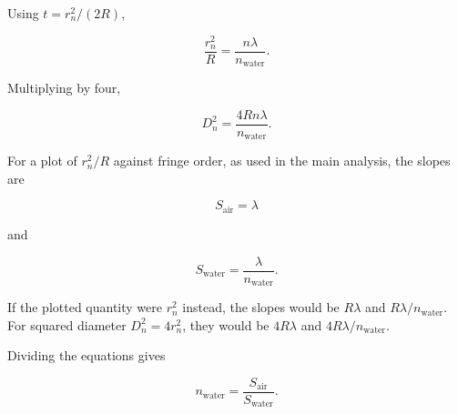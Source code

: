 \documentclass[12pt,a4paper]{article}
\begin{document}
Using $t=r_n^2/(2R)$,

\[
\frac{r_n^2}{R}
=\frac{n\lambda}{n_{\mathrm{water}}}.
\]

Multiplying by four,

\[
D_n^2
=\frac{4Rn\lambda}{n_{\mathrm{water}}}.
\]

For a plot of $r_n^2/R$ against
fringe order, as used in the main
analysis, the slopes are

\[
S_{\mathrm{air}}=\lambda
\]

and

\[
S_{\mathrm{water}}
 =\frac{\lambda}{n_{\mathrm{water}}}.
\]

If the plotted quantity were $r_n^2$
instead, the slopes would be
$R\lambda$ and $R\lambda/n_{\mathrm{water}}$.
For squared diameter $D_n^2=4r_n^2$,
they would be $4R\lambda$ and
$4R\lambda/n_{\mathrm{water}}$.

Dividing the equations gives

\[
\boxed{
n_{\mathrm{water}}
=\frac{S_{\mathrm{air}}}{S_{\mathrm{water}}}
}.
\]
\end{document}
